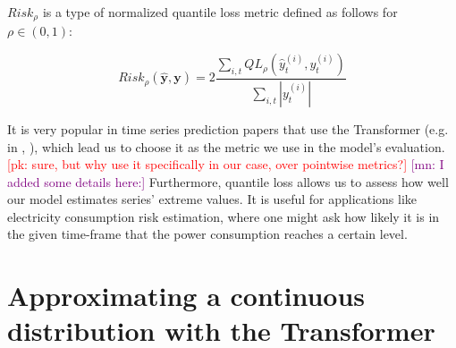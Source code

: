 \documentclass[en]{pracamgr}
\newtheorem{defi}{Definition}[section]
\newcommand{\pk}[1]{\textcolor{red}{\small [pk: #1]}}
\newcommand{\mn}[1]{\textcolor{purple}{\small [mn: #1]}}
\begin{document}
$Risk_\rho$ is a type of normalized quantile loss metric defined as follows for $\rho \in (0,1)$:

$$ Risk_\rho(\hat{\textbf{y}}, \textbf{y}) 
= 2\frac{\sum_{i,t}QL_\rho(\hat{y}^{(i)}_t, y^{(i)}_t)}
{\sum_{i,t} |y^{(i)}_t|}$$


It is very popular in time series prediction papers that use the Transformer (e.g. in \cite{enhancing}, \cite{deepar}), which lead us to choose it as the metric we use in the model's evaluation. \pk{sure, but why use it specifically in our case, over pointwise metrics?} \mn{I added some details here:} Furthermore, quantile loss allows us to assess how well our model estimates series' extreme values. It is useful for applications like electricity consumption risk estimation, where one might ask how likely it is in the given time-frame that the power consumption reaches a certain level. 


%




\chapter{Approximating a continuous distribution with the Transformer}





\end{document}
